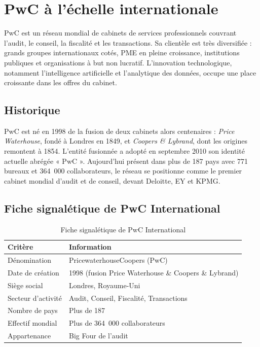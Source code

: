 \documentclass[12pt,a4paper,twoside]{report}
\begin{document}
\section{PwC à l'échelle internationale}

PwC est un réseau mondial de cabinets de services professionnels couvrant l'audit, le conseil, la fiscalité et les transactions. Sa clientèle est très diversifiée : grands groupes internationaux cotés, PME en pleine croissance, institutions publiques et organisations à but non lucratif. L'innovation technologique, notamment l'intelligence artificielle et l'analytique des données, occupe une place croissante dans les offres du cabinet.

\subsection{Historique}

PwC est né en 1998 de la fusion de deux cabinets alors centenaires : \textit{Price Waterhouse}, fondé à Londres en 1849, et \textit{Coopers \& Lybrand}, dont les origines remontent à 1854. L'entité fusionnée a adopté en septembre 2010 son identité actuelle abrégée « PwC ». Aujourd'hui présent dans plus de 187 pays avec 771 bureaux et 364~000 collaborateurs, le réseau se positionne comme le premier cabinet mondial d'audit et de conseil, devant Deloitte, EY et KPMG.

\subsection{Fiche signalétique de PwC International}

\begin{table}[H]
\centering
\caption{Fiche signalétique de PwC International}
\label{tab:fiche_pwc_intl}
\begin{tabular}{ll}
\toprule
\textbf{Critère}     & \textbf{Information} \\
\midrule
Dénomination         & PricewaterhouseCoopers (PwC) \\
Date de création     & 1998 (fusion Price Waterhouse \& Coopers \& Lybrand) \\
Siège social         & Londres, Royaume-Uni \\
Secteur d'activité   & Audit, Conseil, Fiscalité, Transactions \\
Nombre de pays       & Plus de 187 \\
Effectif mondial     & Plus de 364~000 collaborateurs \\
Appartenance         & Big Four de l'audit \\
\bottomrule
\end{tabular}
\end{table}
\end{document}
